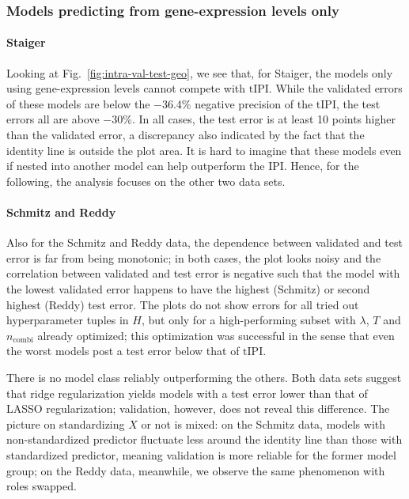 \subsubsection{Models predicting from gene-expression levels only}



\paragraph{Staiger}
Looking at Fig.\ \ref{fig:intra-val-test-geo}, we see that, for Staiger, the models only using 
gene-expression levels cannot compete with $\text{tIPI}$. While the validated errors of these models are 
below the \num{-36.4}\% negative precision of the tIPI, the test errors all are above \num{-30}\%. 
In all cases, the test error is at least 10 points higher than the validated error, a discrepancy 
also indicated by the fact that the identity line is outside the plot area. It is hard to imagine that 
these models even if nested into another model can help outperform the IPI. Hence, for the 
following, the analysis focuses on the other two data sets.

\paragraph{Schmitz and Reddy}
Also for the Schmitz and Reddy data, the dependence between validated and test error is far from 
being monotonic; in both cases, the plot looks noisy and the correlation between validated and test 
error is negative such that the model with the lowest validated error happens to have the highest 
(Schmitz) or second highest (Reddy) test error. The plots do not show errors for all tried out 
hyperparameter tuples in $H$, but only for a high-performing subset with $\lambda$, $T$ and 
$n_\text{combi}$ already 
optimized; this optimization was successful in the sense that even the worst models post a test 
error below that of $\text{tIPI}$.

There is no model class reliably outperforming the others. Both data sets suggest that ridge 
regularization yields models with a test error lower than that of LASSO regularization; validation, 
however, does not reveal this difference. The picture on standardizing $X$ or not is mixed: on the 
Schmitz data, models with non-standardized predictor fluctuate less around the identity line than 
those with standardized predictor, meaning validation is more reliable for the former model group;
on the Reddy data, meanwhile, we observe the same phenomenon with roles swapped.

